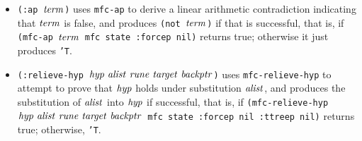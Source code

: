 \begin{itemize}
\item {\tt (:ap $\mathit{term}$)} uses {\tt mfc-ap} to derive a linear
  arithmetic contradiction indicating that $\mathit{term}$ is false, and
  produces {\tt (not $\mathit{term}$)} if that is successful, that is, if
  {\tt (mfc-ap $\mathit{term}$ mfc state :forcep nil)} returns true;
  otherwise it just produces {\tt 'T}.

\item {\tt (:relieve-hyp $\var{hyp}\ \var{alist}\ \var{rune}\
    \var{target}\ \var{backptr}$)} uses {\tt mfc-relieve-hyp} to
  attempt to prove that $\mathit{hyp}$ holds under substitution
  $\mathit{alist}$, and produces the substitution of
  $\mathit{alist}$ into $\mathit{hyp}$ if successful, that is, if
  {\tt (mfc-relieve-hyp $\var{hyp}\ \var{alist}\ \var{rune}\
    \var{target}\ \var{backptr}$ mfc state :forcep nil :ttreep nil)}
  returns true; otherwise, {\tt 'T}.

\end{itemize}

